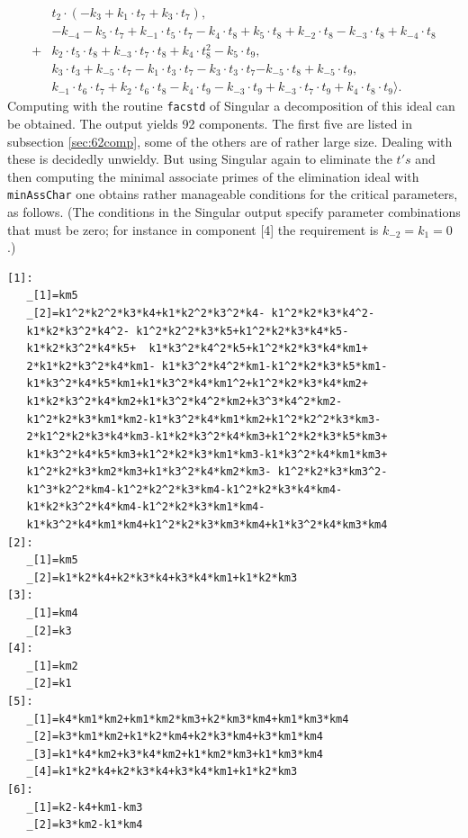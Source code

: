 \documentclass{article}
\begin{document}
\[\begin{array}{ll}
    &t_2\cdot (-k_3+k_1\cdot t_7+k_3\cdot t_7),\\
    &-k_{-4}-k_5\cdot t_7{+}k_{-1}\cdot t_5\cdot t_7-k_4\cdot t_8+k_5\cdot t_8+k_{-2}\cdot t_8-k_{-3}\cdot t_8+k_{-4}\cdot t_8\\+&k_2\cdot t_5\cdot t_8+{k_{-3}}\cdot t_7\cdot t_8+k_4\cdot t_8^2-k_5\cdot t_9,\\
    &k_3\cdot t_3+k_{-5}\cdot t_7-k_1\cdot t_3\cdot t_7-k_3\cdot t_3\cdot t_7{-k_{-5}\cdot t_8}+k_{-5}\cdot t_9,\\
    &k_{-1}\cdot t_6\cdot t_7+k_2\cdot t_6\cdot t_8-k_4\cdot t_9-k_{-3}\cdot t_9+k_{-3}\cdot t_7\cdot t_9+k_4\cdot t_8\cdot t_9\rangle.
\end{array}
\]
Computing with the routine {\tt facstd}  of  {\sc Singular} \cite{sing} a decomposition  of   this ideal can be obtained. The output yields 92  components. The first five are listed in subsection \ref{sec:62comp}, some of the others are of rather large size. Dealing with these is decidedly unwieldy.  But using {\sc Singular} again to eliminate the $t's$ and then computing the minimal associate primes of the elimination ideal with \texttt{minAssChar}   one obtains  rather manageable conditions for the critical parameters, as follows. (The conditions in the {\sc Singular} output specify parameter combinations that must be zero; for instance in component [4] the requirement is $k_{-2}=k_1=0$.)

\begin{verbatim}
[1]:
   _[1]=km5
   _[2]=k1^2*k2^2*k3*k4+k1*k2^2*k3^2*k4- k1^2*k2*k3*k4^2-
   k1*k2*k3^2*k4^2- k1^2*k2^2*k3*k5+k1^2*k2*k3*k4*k5-
   k1*k2*k3^2*k4*k5+  k1*k3^2*k4^2*k5+k1^2*k2*k3*k4*km1+
   2*k1*k2*k3^2*k4*km1- k1*k3^2*k4^2*km1-k1^2*k2*k3*k5*km1-
   k1*k3^2*k4*k5*km1+k1*k3^2*k4*km1^2+k1^2*k2*k3*k4*km2+
   k1*k2*k3^2*k4*km2+k1*k3^2*k4^2*km2+k3^3*k4^2*km2-
   k1^2*k2*k3*km1*km2-k1*k3^2*k4*km1*km2+k1^2*k2^2*k3*km3-
   2*k1^2*k2*k3*k4*km3-k1*k2*k3^2*k4*km3+k1^2*k2*k3*k5*km3+
   k1*k3^2*k4*k5*km3+k1^2*k2*k3*km1*km3-k1*k3^2*k4*km1*km3+
   k1^2*k2*k3*km2*km3+k1*k3^2*k4*km2*km3- k1^2*k2*k3*km3^2-
   k1^3*k2^2*km4-k1^2*k2^2*k3*km4-k1^2*k2*k3*k4*km4-
   k1*k2*k3^2*k4*km4-k1^2*k2*k3*km1*km4-
   k1*k3^2*k4*km1*km4+k1^2*k2*k3*km3*km4+k1*k3^2*k4*km3*km4
[2]:
   _[1]=km5
   _[2]=k1*k2*k4+k2*k3*k4+k3*k4*km1+k1*k2*km3
[3]:
   _[1]=km4
   _[2]=k3
[4]:
   _[1]=km2
   _[2]=k1
[5]:
   _[1]=k4*km1*km2+km1*km2*km3+k2*km3*km4+km1*km3*km4
   _[2]=k3*km1*km2+k1*k2*km4+k2*k3*km4+k3*km1*km4
   _[3]=k1*k4*km2+k3*k4*km2+k1*km2*km3+k1*km3*km4
   _[4]=k1*k2*k4+k2*k3*k4+k3*k4*km1+k1*k2*km3
[6]:
   _[1]=k2-k4+km1-km3
   _[2]=k3*km2-k1*km4
\end{verbatim}
\end{document}
